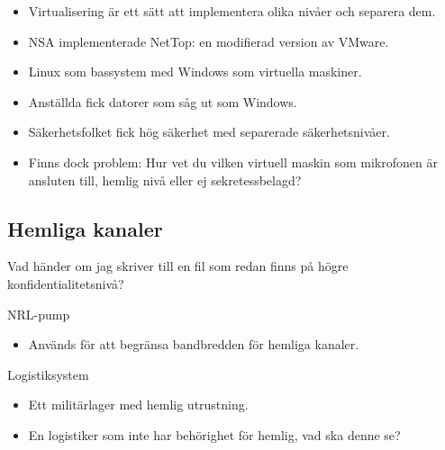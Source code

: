 \begin{frame}{\insertsubsectionhead}
  \begin{itemize}
    \item Virtualisering är ett sätt att implementera olika nivåer och separera 
      dem.
    \item NSA implementerade NetTop: en modifierad version av VMware.
    \item Linux som bassystem med Windows som virtuella maskiner.
    \item Anställda fick datorer som såg ut som Windows.
    \item Säkerhetsfolket fick hög säkerhet med separerade säkerhetsnivåer.
    \item Finns dock problem:
      Hur vet du vilken virtuell maskin som mikrofonen är ansluten till, hemlig 
      nivå eller ej sekretessbelagd?
  \end{itemize}
\end{frame}

\subsection{Hemliga kanaler}
\begin{frame}{\insertsubsectionhead}
  Vad händer om jag skriver till en fil som redan finns på högre 
  konfidentialitetsnivå?
\end{frame}
\begin{frame}{\insertsubsectionhead}{NRL-pump}
  \begin{itemize}
    \item Används för att begränsa bandbredden för hemliga kanaler.
  \end{itemize}
\end{frame}
\begin{frame}{\insertsubsectionhead}{Logistiksystem}
  \begin{itemize}
    \item Ett militärlager med hemlig utrustning.
    \item En logistiker som inte har behörighet för hemlig, vad ska denne se?
  \end{itemize}
\end{frame}



\begin{frame}[allowframebreaks]
  \printbibliography{}
\end{frame}
